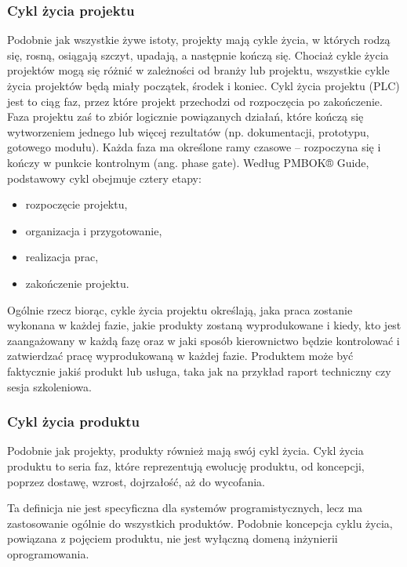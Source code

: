 \subsubsection{Cykl życia projektu}
Podobnie jak wszystkie żywe istoty, projekty mają cykle życia, w których rodzą się, rosną, osiągają szczyt, upadają, a następnie kończą się. \autocite{gido} Chociaż cykle życia projektów mogą się różnić w zależności od branży lub projektu, wszystkie cykle życia projektów będą miały początek, środek i koniec. \autocite{Rosenau} Cykl życia projektu (PLC) jest to ciąg faz, przez które projekt przechodzi od rozpoczęcia po zakończenie. \autocite{pmbok7} Faza projektu zaś to zbiór logicznie powiązanych działań, które kończą się wytworzeniem jednego lub więcej rezultatów (np. dokumentacji, prototypu, gotowego modułu). Każda faza ma określone ramy czasowe – rozpoczyna się i kończy w punkcie kontrolnym (ang. phase gate). Według PMBOK® Guide, podstawowy cykl obejmuje cztery etapy:
\begin{itemize}
    \item rozpoczęcie projektu,
    \item organizacja i przygotowanie,
    \item realizacja prac,
    \item zakończenie projektu.
\end{itemize}

Ogólnie rzecz biorąc, cykle życia projektu określają, jaka praca zostanie wykonana w każdej fazie, jakie produkty zostaną wyprodukowane i kiedy, kto jest zaangażowany w każdą fazę oraz w jaki sposób kierownictwo będzie kontrolować i zatwierdzać pracę wyprodukowaną w każdej fazie. Produktem może być faktycznie jakiś produkt lub usługa, taka jak na przykład raport techniczny czy sesja szkoleniowa. \autocite{ITPM}

\subsubsection{Cykl życia produktu}
Podobnie jak projekty, produkty również mają swój cykl życia. Cykl życia produktu to seria faz, które reprezentują ewolucję produktu, od koncepcji, poprzez dostawę, wzrost, dojrzałość, aż do wycofania. \autocite{pmbok6}

Ta definicja nie jest specyficzna dla systemów programistycznych, lecz ma zastosowanie ogólnie do wszystkich produktów. Podobnie koncepcja cyklu życia, powiązana z pojęciem produktu, nie jest wyłączną domeną inżynierii oprogramowania.

